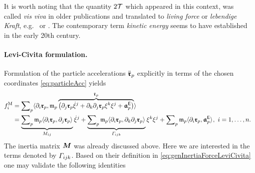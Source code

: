 It is worth noting that the quantity $2\mathcal{T}$ which appeared in this context, was called \textit{vis viva} in older publications and translated to \textit{living force} or \textit{lebendige Kraft}, e.g.\ \cite{Hamel:LagrangeEuler} or \cite[chap.\ 5]{Klein:EntwicklungDerMathematik}.
The contemporary term \textit{kinetic energy} seems to have established in the early 20th century.


\paragraph{Levi-Civita formulation.}
Formulation of the particle accelerations $\ddot{\boldsymbol{\mathfrak{r}}}_{p}$ explicitly in terms of the chosen coordinates \eqref{eq:particleAcc} yields
\begin{align}\label{eq:genInertiaForceLeviCivita}
 f^{\mathrm{M}}_{i} &= \sum\nolimits_{p} \langle \partial_{i} \boldsymbol{\mathfrak{r}}_{p}, \mathfrak{m}_{p} \overbrace{\big(\partial_{j} \boldsymbol{\mathfrak{r}}_{p} \dot{\xi}^{j} + \partial_{k} \partial_{j} \boldsymbol{\mathfrak{r}}_{p} \xi^{k} \xi^{j} + \boldsymbol{\mathfrak{a}}_{p}^{\mathsf{E}}\big)}^{\ddot{\boldsymbol{\mathfrak{r}}}_{p}} \rangle_{}
\\
 &= \underbrace{\sum\nolimits_{p} \mathfrak{m}_{p} \langle \partial_{i} \boldsymbol{\mathfrak{r}}_{p}, \partial_{j} \boldsymbol{\mathfrak{r}}_{p} \rangle_{}}_{M_{ij}} \dot{\xi}^{j}
 + \underbrace{\sum\nolimits_{p} \mathfrak{m}_{p} \langle \partial_{i} \boldsymbol{\mathfrak{r}}_{p}, \partial_{k} \partial_{j} \boldsymbol{\mathfrak{r}}_{p} \rangle_{}}_{\varGamma_{ijk}} \xi^{k} \xi^{j}
 + \sum\nolimits_{p} \mathfrak{m}_{p} \langle \partial_{i} \boldsymbol{\mathfrak{r}}_{p}, \boldsymbol{\mathfrak{a}}_{p}^{\mathsf{E}} \rangle_{},
 \
 i = 1,\ldots,n.
\nonumber
\end{align}
The inertia matrix $\boldsymbol{M}$ was already discussed above.
Here we are interested in the terms denoted by $\varGamma_{ijk}$.
Based on their definition in \eqref{eq:genInertiaForceLeviCivita} one may validate the following identities
